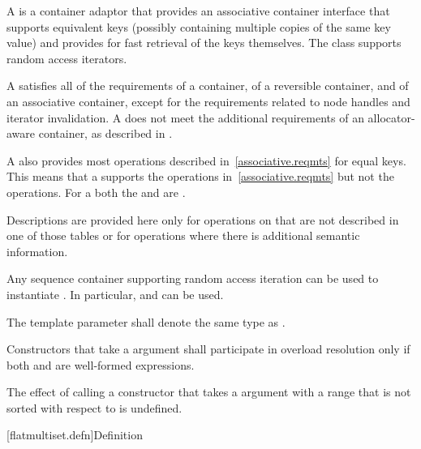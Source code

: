 \begin{codeblock}
\begin{codeblock}
\begin{codeblock}
\begin{addedblock}
\pnum
{}%
A  is a container adaptor that provides an associative
container interface that supports equivalent keys (possibly containing
multiple copies of the same key value) and provides for fast retrieval of the
keys themselves. The  class supports random access
iterators.

\pnum
A  satisfies all of the requirements of a container, of a
reversible container, and of an associative
container, except for the requirements related to
node handles and iterator
invalidation.  A  does
not meet the additional requirements of an allocator-aware container, as
described in .

\pnum
A  also provides most operations described
in~\ref{associative.reqmts} for equal keys.  This means that a
 supports the  operations
in~\ref{associative.reqmts} but not the  operations.  For a
 both the  and  are
.

\pnum
Descriptions are provided here only for operations on  that
are not described in one of those tables or for operations where there is
additional semantic information.

\pnum
Any sequence container supporting random access iteration can be used to
instantiate . In particular, 
and  can be used.

\pnum
The template parameter  shall denote the same type as
.

\pnum
Constructors that take a  argument  shall
participate in overload resolution only if both  and
 are well-formed expressions.

\pnum
The effect of calling a constructor that takes a 
argument with a range that is not sorted with respect to  is
undefined.

[flatmultiset.defn]{Definition}


\end{addedblock}
\end{codeblock}
\end{codeblock}
\end{codeblock}

